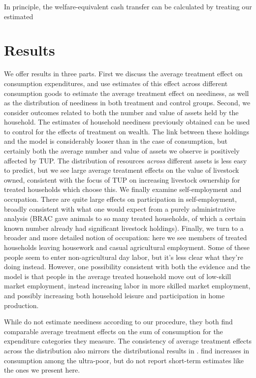 \documentclass[12pt,letterpaper]{article}
\begin{document}
In principle, the welfare-equivalent cash transfer can be
calculated by treating our estimated

\section{Results}
\label{sec:orgheadline18}

We offer results in three parts.  First we discuss the average
treatment effect on consumption expenditures, and use estimates of
this effect across different consumption goods to estimate the average
treatment effect on neediness, as well as the distribution of
neediness in both treatment and control groups.  Second, we consider
outcomes related to both the number and value of assets held by the
household.  The estimates of household neediness previously obtained
can be used to control for the effects of treatment on wealth.  The
link between these holdings and the model is considerably looser than
in the case of consumption, but certainly both the average number and
value of assets we observe is positively affected by TUP.  The
distribution of resources \emph{across} different assets is less easy to
predict, but we see large average treatment effects on the value of
livestock owned, consistent with the focus of TUP on increasing
livestock ownership for treated households which choose this.  We
finally examine self-employment and occupation.  There are quite large
effects on participation in self-employment, broadly consistent with
what one would expect from a purely administrative analysis (BRAC gave
animals to so many treated households, of which a certain known number
already had significant livestock holdings).  Finally, we turn to a
broader and more detailed notion of occupation: here we see members of
treated households leaving housework and casual agricultural
employment.  Some of these people seem to enter non-agricultural day
labor, but it's less clear what they're doing instead.  However, one
possibility consistent with both the evidence and the model is that
people in the average treated household move out of low-skill market
employment, instead increasing labor in more skilled market
employment, and possibly increasing both household leisure and
participation in home production.

While \cite{banerjee-etal15} do not estimate neediness according to our procedure,
they both find comparable average treatment effects on the sum of 
consumption for the expenditure categories they measure. The consistency of average
treatment effects across the distribution also mirrors the distributional results in
\cite{banerjee-etal15}. \cite{Bandiera-etal15} find increases in consumption among
the ultra-poor, but do not report short-term estimates like the ones we present here.
\end{document}
